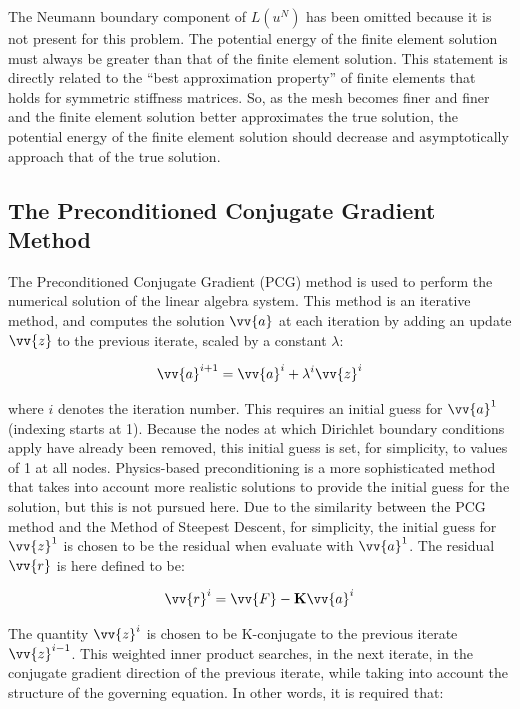 \documentclass[10pt]{article}
\begin{document}
The Neumann boundary component of \(L(u^N)\) has been omitted because it is not present for this problem. The potential energy of the finite element solution must always be greater than that of the finite element solution. This statement is directly related to the ``best approximation property'' of finite elements that holds for symmetric stiffness matrices. So, as the mesh becomes finer and finer and the finite element solution better approximates the true solution, the potential energy of the finite element solution should decrease and asymptotically approach that of the true solution.

\subsection{The Preconditioned Conjugate Gradient Method}

The Preconditioned Conjugate Gradient (PCG) method is used to perform the numerical solution of the linear algebra system. This method is an iterative method, and computes the solution \(\vv{a}\) at each iteration by adding an update \(\vv{z}\) to the previous iterate, scaled by a constant \(\lambda\):

\begin{equation}
\label{eq:PCGUpdate}
\vv{a}^{i+1}=\vv{a}^i+\lambda^i\vv{z}^i
\end{equation}

where \(i\) denotes the iteration number. This requires an initial guess for \(\vv{a}^1\) (indexing starts at 1). Because the nodes at which Dirichlet boundary conditions apply have already been removed, this initial guess is set, for simplicity, to values of 1 at all nodes. Physics-based preconditioning is a more sophisticated method that takes into account more realistic solutions to provide the initial guess for the solution, but this is not pursued here. Due to the similarity between the PCG method and the Method of Steepest Descent, for simplicity, the initial guess for \(\vv{z}^1\) is chosen to be the residual when evaluate with \(\vv{a}^1\). The residual \(\vv{r}\) is here defined to be:

\begin{equation}
\vv{r}^i=\vv{F}-\textbf{K}\vv{a}^i
\end{equation}

The quantity \(\vv{z}^i\) is chosen to be K-conjugate to the previous iterate \(\vv{z}^{i-1}\). This weighted inner product searches, in the next iterate, in the conjugate gradient direction of the previous iterate, while taking into account the structure of the governing equation. In other words, it is required that:
\end{document}
